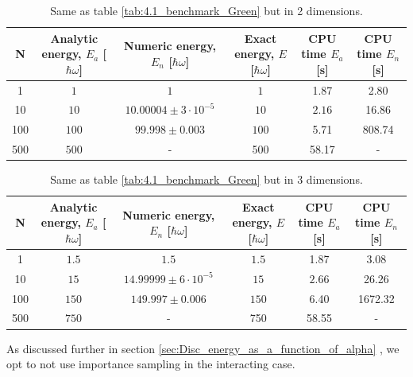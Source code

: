 \documentclass[a4paper, 10pt]{article}
\begin{document}
		 \begin{table}[ht!]
		 	\begin{adjustwidth}{-2cm}{}
		 		\begin{tabular}{cccccc}
		 			N & Analytic energy, $E_a$ [$\hbar \omega$] & Numeric energy, $E_n$ [$\hbar \omega$] & Exact energy, $E$ [$\hbar \omega$]& CPU time $E_a$ [s] &CPU time $E_n$ [s]\\
		 			\hline
		 			1&$1$&$1$&$1$& 1.87&2.80\\
		 			10&$10$&$10.00004\pm 3\cdot 10^{-5}$&$10$& $2.16$&16.86\\
		 			100&$100$&$99.998\pm 0.003$&$100$&5.71&808.74\\
		 			500&$500$&-&500 &58.17 &-
		 		\end{tabular}
		 	\end{adjustwidth}
		 	\caption{Same as table \ref{tab:4.1_benchmark_Green} but in 2 dimensions.}\label{tab:4.1_benchmark_Green_2D}
		 \end{table}
		 \begin{table}[ht!]
		 	\begin{adjustwidth}{-2cm}{}
		 		\begin{tabular}{cccccc}
		 			N & Analytic energy, $E_a$ [$\hbar \omega$] & Numeric energy, $E_n$ [$\hbar \omega$] & Exact energy, $E$ [$\hbar \omega$]& CPU time $E_a$ [s] &CPU time $E_n$ [s]\\
		 			\hline
		 			1&$1.5$&$1.5$&$1.5$& 1.87&3.08\\
		 			10&$15$&$14.99999\pm 6\cdot 10^{-5}$&$15$& $2.66$&26.26\\
		 			100&$150$&$149.997\pm 0.006$&$150$&6.40&1672.32\\
		 			500&$750$&-&750 &58.55 &-
		 		\end{tabular}
		 	\end{adjustwidth}
		 	\caption{Same as table \ref{tab:4.1_benchmark_Green} but in 3 dimensions.}\label{tab:4.1_benchmark_Green_3D}
		 \end{table}
	As discussed further in section \ref{sec:Disc_energy_as_a_function_of_alpha} , we opt to not use importance sampling in the interacting case.
\end{document}
